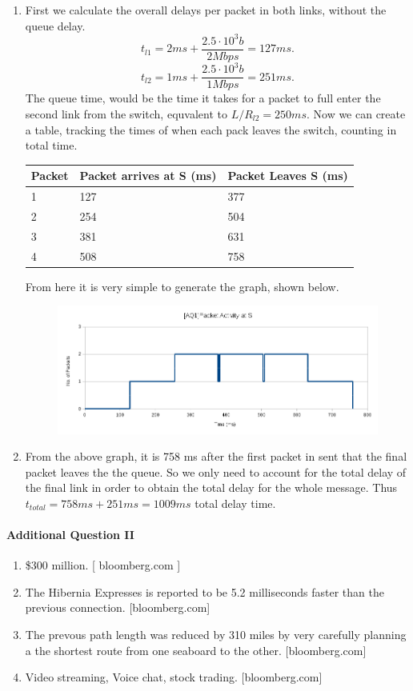 \documentclass[12pt]{article}
\begin{document}
\begin{enumerate}
\item First we calculate the overall delays per packet in both links, without the queue delay.
$$t_{l1} = 2ms + \frac{2.5\cdot10^3 b}{2Mbps} = 127ms.$$
$$t_{l2} = 1ms + \frac{2.5\cdot10^3 b}{1Mbps} = 251ms.$$
The queue time, would be the time it takes for a packet to full enter the second link  from the switch, equvalent to $L/R_{l2} = 250ms$. Now we can create a table, tracking the times of when each pack leaves the switch, counting in total time.
\begin{center}
	\begin{tabular}{ | l | l | l | } 
	\hline
	Packet & Packet arrives at S (ms) & Packet Leaves S (ms) \\ \hline
	1 & 127 & 377 \\ \hline
	2 & 254 & 504 \\ \hline
	3 & 381 & 631 \\ \hline
	4 & 508 & 758 \\ \hline
	\end{tabular}
\end{center}
From here it is very simple to generate the graph, shown below. 
\begin{figure}[h]
\includegraphics[width=\textwidth, scale = 0.25]{AQ1_graph}
\end{figure}

\item From the above graph, it is 758 ms after the first packet in sent that the final packet leaves the the queue. So we only need to account for the total delay of the final link in order to obtain the total delay for the whole message. Thus $t_{total} = 758ms  + 251ms = 1009ms$ total delay time.
\end{enumerate}

\paragraph{Additional Question II\\}
\begin{enumerate}[label = \alph*)]
\item \$300 million. [ bloomberg.com ]
\item The Hibernia Expresses is reported to be 5.2 milliseconds faster than the previous connection. [bloomberg.com]
\item The prevous path length was reduced by 310 miles by very carefully planning a the shortest route from one seaboard to the other. [bloomberg.com]
\item Video streaming, Voice chat, stock trading. [bloomberg.com]
\end{enumerate}
\end{document}
